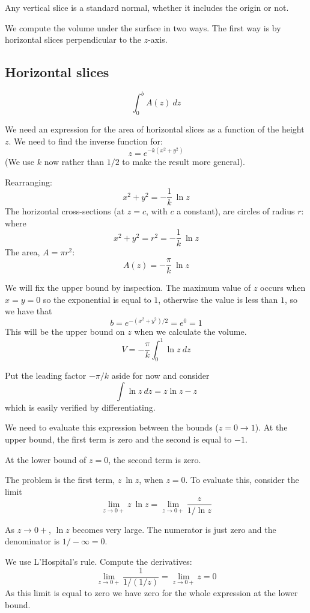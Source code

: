 \documentclass[11pt, oneside]{article}
\begin{document}
Any vertical slice is a standard normal, whether it includes the origin or not.

We compute the volume under the surface in two ways.  The first way is by horizontal slices perpendicular to the $z$-axis.

\subsection*{Horizontal slices}
\[ \int_0^b A(z) \ dz \]

We need an expression for the area of horizontal slices as a function of the height $z$.  We need to find the inverse function for:
\[ z = e^{-k(x^2 + y^2)} \]
(We use $k$ now rather than $1/2$ to make the result more general).

Rearranging:
\[ x^2 + y^2 = -\frac{1}{k} \ \ln z \]
The horizontal cross-sections (at $z = c$, with $c$ a constant), are circles of radius $r$: where
\[ x^2 + y^2 = r^2 = -\frac{1}{k} \ \ln z \]
The area, $A = \pi r^2$:
\[ A(z) = -\frac{\pi}{k} \ \ln z  \]

We will fix the upper bound by inspection.  The maximum value of $z$ occurs when $x=y=0$ so the exponential is equal to $1$, otherwise the value is less than $1$, so we have that 
\[  b = e^{-(x^2 + y^2)/2} = e^0 = 1 \]
This will be the upper bound on $z$ when we calculate the volume.
\[ V = -\frac{\pi}{k} \int_0^1 \ln z \ dz \]

Put the leading factor $-\pi/k$ aside for now and consider
\[ \int \ln z \ dz = z \ln z - z \]
which is easily verified by differentiating.

We need to evaluate this expression between the bounds ($z=0 \rightarrow 1$).  At the upper bound, the first term is zero and the second is equal to $-1$.

At the lower bound of $z=0$,  the second term is zero.
  
The problem is the first term, $z \ \ln z$, when $z = 0$.  To evaluate this, consider the limit
\[ \lim_{z \rightarrow 0+}  z \ \ln z = \lim_{z \rightarrow 0+}   \frac{z}{1/\ln z} \]

As $z \rightarrow 0+$, $\ln z$ becomes very large.  The numerator is just zero and the denominator is $1/-\infty = 0$.  

We use L'Hospital's rule.  Compute the derivatives:
\[ \lim_{z \rightarrow 0+} \frac{1}{1/(1/z)} = \lim_{z \rightarrow 0+} z = 0 \]
As this limit is equal to zero we have zero for the whole expression at the lower bound.
\end{document}
